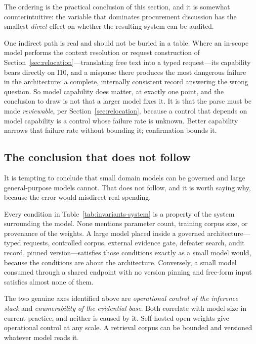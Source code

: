 \documentclass[11pt]{article}
\theoremstyle{plain}
\theoremstyle{definition}
\begin{document}
The ordering is the practical conclusion of this section, and it is somewhat
counterintuitive: the variable that dominates procurement discussion has the smallest
\emph{direct} effect on whether the resulting system can be audited.

One indirect path is real and should not be buried in a table. Where an in-scope model
performs the context resolution or request construction of
Section~\ref{sec:relocation}---translating free text into a typed request---its
capability bears directly on I10, and a misparse there produces the most dangerous
failure in the architecture: a complete, internally consistent record answering the
wrong question. So model capability does matter, at exactly one point, and the
conclusion to draw is not that a larger model fixes it. It is that the parse must be
made \emph{reviewable}, per Section~\ref{sec:relocation}, because a control that depends
on model capability is a control whose failure rate is unknown. Better capability
narrows that failure rate without bounding it; confirmation bounds it.

\subsection{The conclusion that does not follow}
\label{sec:not-follow}

It is tempting to conclude that small domain models can be governed and large
general-purpose models cannot. That does not follow, and it is worth saying why,
because the error would misdirect real spending.

Every condition in Table~\ref{tab:invariants-system} is a property of the system
surrounding the model. None mentions parameter count, training corpus size, or
provenance of the weights. A large model placed inside a governed architecture---typed
requests, controlled corpus, external evidence gate, defeater search, audit record,
pinned version---satisfies those conditions exactly as a small model would, because the
conditions are about the architecture. Conversely, a small model consumed through a
shared endpoint with no version pinning and free-form input satisfies almost none of
them.

The two genuine axes identified above are \emph{operational control of the inference
stack} and \emph{enumerability of the evidential base}. Both correlate with model
size in current practice, and neither is caused by it. Self-hosted open weights give
operational control at any scale. A retrieval corpus can be bounded and versioned
whatever model reads it.
\end{document}

